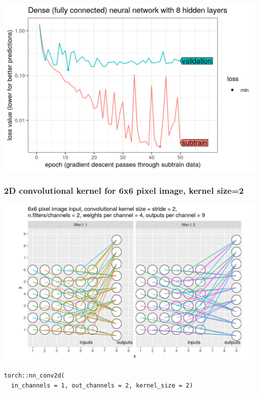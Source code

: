 \documentclass{beamer}
\begin{document}
\begin{frame}
  \includegraphics[width=\textwidth]{figure-validation-loss-dense}
\end{frame}
 
\begin{frame}[fragile]
  \frametitle{2D convolutional kernel for 6x6 pixel image, kernel size=2}
  \includegraphics[width=\textwidth]{figure-conv2d-6x6-kernel=2}
\begin{verbatim}
torch::nn_conv2d(
  in_channels = 1, out_channels = 2, kernel_size = 2)
\end{verbatim}
\end{frame}
\end{document}
